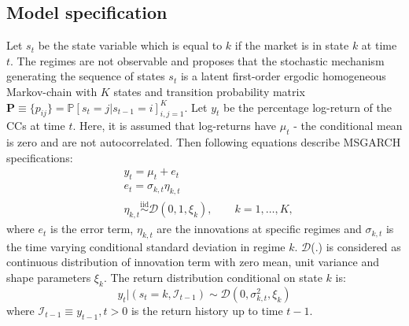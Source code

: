 \documentclass[12pt,a4paper]{article}
\begin{document}
\subsection{Model specification}
Let $s_t$ be the state variable which is equal to $k$ if the market is in state $k$ at time $t$. The regimes are not observable and \cite{ardia2018forecasting} proposes that the stochastic mechanism generating the sequence of states $s_t$ is a latent first-order ergodic homogeneous Markov-chain with $K$ states and transition probability matrix $\mathbf{P} \equiv \{p_{ij}\} = \mathbb{P} [s_t = j|s_{t-1} = i]^K_{i,j=1}$. Let $y_t$ be the percentage log-return of the CCs at time $t$. Here, it is assumed that log-returns have $\mu_t$ - the conditional mean is zero and are not autocorrelated. Then following equations describe MSGARCH specifications:
\begin{align}
	& y_t = \mu_t + e_t \\
	& e_t = \sigma_{k,t}\eta_{k,t} \\
	& \eta_{k,t} \overset{\mathrm{iid}}{\sim} \mathcal{D} (0, 1, \xi_k),\qquad k = 1,\ldots,K, 
\end{align}
where $e_t$ is the error term, $\eta_{k,t}$ are the innovations at specific regimes and $\sigma_{k,t}$ is the time varying conditional standard deviation in regime $k$. $\mathcal{D}$(.) is considered as continuous distribution of innovation term with zero mean, unit variance and shape parameters $\xi_{k}$. 
The return distribution conditional on state $k$ is:
\begin{equation}
	y_t \vert (s_t = k, \mathcal{I}_{t-1})\sim \mathcal{D} (0, \sigma^2_{k,t}, \xi_k)
\end{equation}
where $\mathcal{I}_{t-1} \equiv y_{t-1}, t > 0$ is the return history up to time $t-1$.
\end{document}
